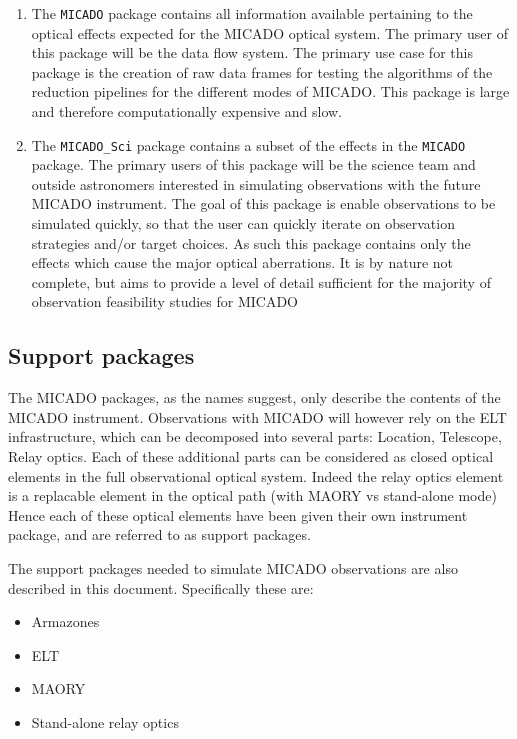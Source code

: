 \begin{enumerate}
\item The \texttt{MICADO} package contains all information available pertaining to the optical effects expected for the MICADO optical system.
The primary user of this package will be the data flow system.
The primary use case for this package is the creation of raw data frames for testing the algorithms of the reduction pipelines for the different modes of MICADO.
This package is large and therefore computationally expensive and slow.

\item The \texttt{MICADO\_Sci} package contains a subset of the effects in the \texttt{MICADO} package.
The primary users of this package will be the science team and outside astronomers interested in simulating observations with the future MICADO instrument.
The goal of this package is enable observations to be simulated quickly, so that the user can quickly iterate on observation strategies and/or target choices.
As such this package contains only the effects which cause the major optical aberrations.
It is by nature not complete, but aims to provide a level of detail sufficient for the majority of observation feasibility studies for MICADO
\end{enumerate}


\subsection{Support packages%
  \label{support-packages}%
}

The MICADO packages, as the names suggest, only describe the contents of the MICADO instrument.
Observations with MICADO will however rely on the ELT infrastructure, which can be decomposed into several parts: Location, Telescope, Relay optics.
Each of these additional parts can be considered as closed optical elements in the full observational optical system.
Indeed the relay optics element is a replacable element in the optical path (with MAORY vs stand-alone mode)
Hence each of these optical elements have been given their own instrument package, and are referred to as support packages.

The support packages needed to simulate MICADO observations are also described in this document. Specifically these are:

\begin{itemize}
\item Armazones

\item ELT

\item MAORY

\item Stand-alone relay optics
\end{itemize}

